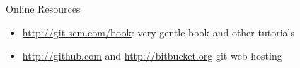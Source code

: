 \begin{frame}
\begin{block}{Online Resources}
  \begin{itemize}
  \item \url{http://git-scm.com/book}: very gentle book and other tutorials
  \item \url{http://github.com} and \url{http://bitbucket.org} git web-hosting
  \end{itemize}
\end{block}

\end{frame}

